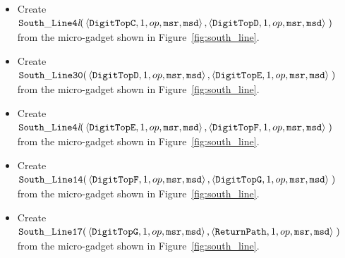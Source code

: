 \begin{itemize}
\begin{itemize}
            \item Create
            $\begin{aligned}[t]
                {\tt South\_Line4\textit{l}}(& \left\langle {\tt DigitTopC}, 1, op, {\tt msr}, {\tt msd}\right\rangle,
                                               \left\langle {\tt DigitTopD}, 1, op, {\tt msr}, {\tt msd}\right\rangle \;)
            \end{aligned}$\\from the micro-gadget shown in Figure~\ref{fig:south_line}.

            \item Create
            $\begin{aligned}[t]
                {\tt South\_Line30}(& \left\langle {\tt DigitTopD}, 1, op, {\tt msr}, {\tt msd}\right\rangle,
                                      \left\langle {\tt DigitTopE}, 1, op, {\tt msr}, {\tt msd}\right\rangle \;)
            \end{aligned}$\\from the micro-gadget shown in Figure~\ref{fig:south_line}.

            \item Create
            $\begin{aligned}[t]
                {\tt South\_Line4\textit{l}}(& \left\langle {\tt DigitTopE}, 1, op, {\tt msr}, {\tt msd}\right\rangle,
                                               \left\langle {\tt DigitTopF}, 1, op, {\tt msr}, {\tt msd}\right\rangle \;)
            \end{aligned}$\\ from the micro-gadget shown in Figure~\ref{fig:south_line}.

            \item Create
            $\begin{aligned}[t]
                {\tt South\_Line14}(& \left\langle {\tt DigitTopF}, 1, op, {\tt msr}, {\tt msd}\right\rangle,
                                      \left\langle {\tt DigitTopG}, 1, op, {\tt msr}, {\tt msd}\right\rangle \;)
            \end{aligned}$\\ from the micro-gadget shown in Figure~\ref{fig:south_line}.

            \item Create
            $\begin{aligned}[t]
                {\tt South\_Line17}(& \left\langle {\tt DigitTopG}, 1, op, {\tt msr}, {\tt msd} \right\rangle,
                                      \left\langle {\tt ReturnPath},     1, op, {\tt msr}, {\tt msd} \right\rangle \;)
            \end{aligned}$\\from the micro-gadget shown in Figure~\ref{fig:south_line}.
        \end{itemize}
        \vspace{1cm}



\end{itemize}
